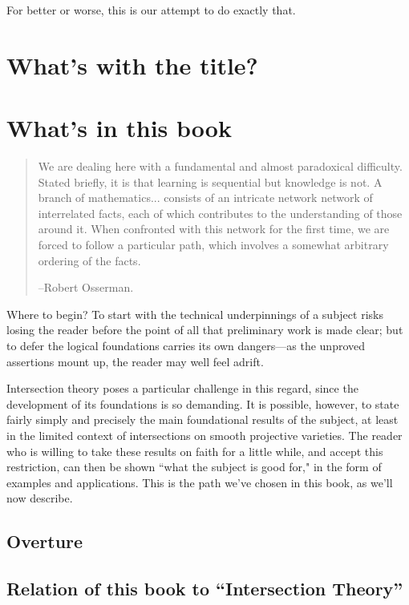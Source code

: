 For better or worse, this is our attempt to do exactly that.

\section{What's with the title?}




\section{What's in this book}


\begin{quote}
\small\sf
We are dealing here with a fundamental and almost paradoxical difficulty. Stated briefly, it is that learning is sequential but knowledge is not. A branch of mathematics... consists of an intricate network network of interrelated facts, each of which contributes to the understanding of those around it. When confronted with this network for the first time, we are forced to follow a particular path, which involves a somewhat arbitrary ordering of the facts.

--Robert Osserman.

\end{quote}



Where to begin? To start with the technical underpinnings of a subject risks losing the reader before the point of all that preliminary work is made clear; but to defer the logical foundations carries its own dangers---as the unproved assertions mount up, the reader may well feel adrift.

Intersection theory poses a particular challenge in this regard, since the development of its foundations is so demanding. It is possible, however, to state fairly simply and precisely the main foundational results of the subject, at least in the limited context of intersections on smooth projective varieties. The reader who is willing to take these results on faith for a little while, and accept this restriction, can then be shown ``what the subject is good for," in the form of examples and applications. This is the path we've chosen in this book, as we'll now describe.

\subsection{Overture}



\subsection{Relation of this book to ``Intersection Theory''} 


